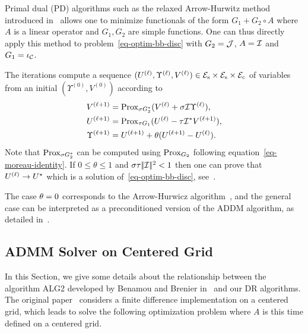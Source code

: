 Primal dual (PD) algorithms such as the relaxed Arrow-Hurwitz method introduced in~\cite{Chambolle2011} allows one to minimize functionals of the form $G_1+G_2 \circ A$ where $A$ is a linear operator and $G_1, G_2$ are simple functions. One can thus directly apply this method to problem~\eqref{eq-optim-bb-disc} with $G_2=\mathcal{J}$, $A=\mathcal{I}$ 	and $G_1 = \iota_{\mathcal{C}}$.

The iterations compute a sequence $({U}^{(\ell)},{\Upsilon}^{(\ell)}, {V}^{(\ell)}) \in \mathcal{E}_{\text{s}} \times \mathcal{E}_{\text{s}} \times \mathcal{E}_{\text{c}}$ of variables from an initial $(\Upsilon^{(0)}, V^{(0)})$ according to
\begin{equation}
\begin{aligned}
	{V}^{(\ell+1)} &= \operatorname{Prox}_{\sigma G_2^*}( {V}^{(\ell)} + \sigma \mathcal{I}    {\Upsilon}^{(\ell)} ), \\
	{U}^{(\ell+1)} &= \operatorname{Prox}_{\tau G_1}(  {U}^{(\ell)} - \tau \mathcal{I}^*{V}^{(\ell+1)}   ), \\
	{\Upsilon}^{(\ell+1)} &= {U}^{(\ell+1)} + \theta (  {U}^{(\ell+1)} - {U}^{(\ell)} ).
\end{aligned}
\end{equation}
Note that $\operatorname{Prox}_{\sigma G_2^*}$ can be computed using $\operatorname{Prox}_{G_2}$ following equation~\eqref{eq-moreau-identity}. If $0 \leq \theta \leq 1$ and  $\sigma \tau |\!| \mathcal{I} |\!|^2<1$ then one can prove that ${U}^{(\ell)} \rightarrow U^\star$ which is a solution of~\eqref{eq-optim-bb-disc}, see~\cite{Chambolle2011}.

The case $\theta=0$ corresponds to the Arrow-Hurwicz algorithm~\cite{Arrow1958}, and the general case can be interpreted as a preconditioned version of the ADDM algorithm, as detailed in~\cite{Chambolle2011}.



\subsection{ADMM Solver on Centered Grid}
\label{subsec-addm-centered-grid}

In this Section, we give some details about the relationship between the algorithm ALG2 developed by Benamou and Brenier in~\cite{Benamou2000} and our DR algorithms. The original paper~\cite{Benamou2000} considers a finite difference implementation on a centered grid, which leads to solve the following optimization problem
where $A$ is this time defined on a centered grid. 

